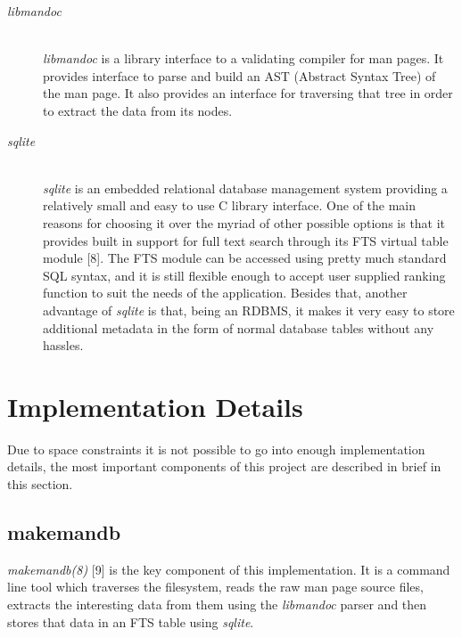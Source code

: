 \documentclass[letterpaper,twocolumn,10pt]{article}
\begin{document}
\begin{description}
\item[\textit{libmandoc}] \hfill \\
\textit{libmandoc} is a library interface to a validating compiler for man pages. It provides
interface to parse and build an AST (Abstract Syntax Tree) of the man page. It
also provides an interface for traversing that tree in order to extract the data
from its nodes.
\end{description}

\begin{description}
\item[\textit{sqlite}] \hfill \\
\textit{sqlite} is an embedded relational database management system providing a
relatively small and easy to use C library interface. One of the main reasons
for choosing it over the myriad of other possible options is that it provides
built in support for full text search through its FTS virtual table module [8].
The FTS module can be accessed using pretty much standard SQL syntax, and it is
still flexible enough to accept user supplied ranking function to suit the needs
of the application. Besides that, another advantage of \textit{sqlite} is that, 
being an RDBMS, it makes it very easy to store additional metadata in the form
of normal database tables without any hassles.
\end{description}

\section{Implementation Details}
Due to space constraints it is not possible to go into enough implementation
details, the most important components of this project are described in brief
in this section.

\subsection{makemandb}
\textit{makemandb(8)} [9] is the key component of this implementation. It is a
command line tool which traverses the filesystem, reads the raw man page source files, extracts the interesting data from them using the \textit{libmandoc} parser and then stores that data in an FTS table using \textit{sqlite}. \\
\end{document}
